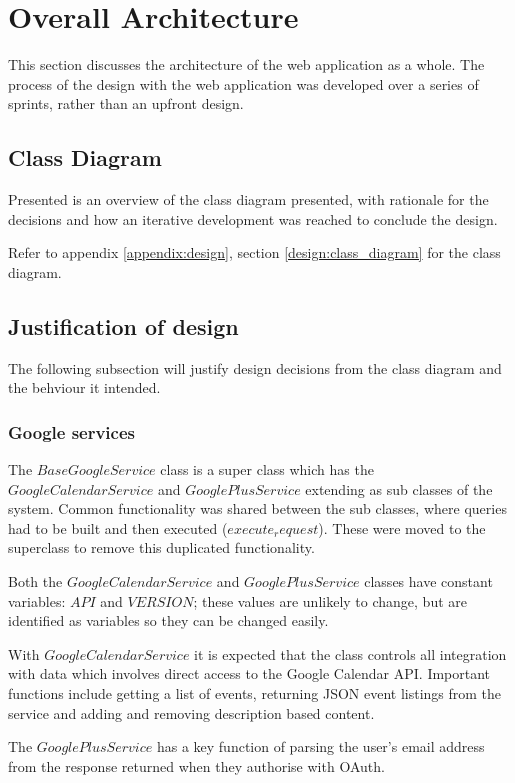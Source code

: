 \section{Overall Architecture}
This section discusses the architecture of the web application as a whole. The process of the design with the web application was developed over a series of sprints, rather than an upfront design.

\subsection{Class Diagram}
Presented is an overview of the class diagram presented, with rationale for the decisions and how an iterative development was reached to conclude the design.

Refer to appendix \ref{appendix:design}, section \ref{design:class_diagram} for the class diagram.

\subsection{Justification of design}
The following subsection will justify design decisions from the class diagram and the behviour it intended.
\subsubsection{Google services}
The $BaseGoogleService$ class is a super class which has the $GoogleCalendarService$ and $GooglePlusService$ extending as sub classes of the system. Common functionality was shared between the sub classes, where queries had to be built and then executed ($execute_request$). These were moved to the superclass to remove this duplicated functionality.

Both the $GoogleCalendarService$ and $GooglePlusService$ classes have constant variables: $API$ and $VERSION$; these values are unlikely to change, but are identified as variables so they can be changed easily.

With $GoogleCalendarService$ it is expected that the class controls all integration with data which involves direct access to the Google Calendar API. Important functions include getting a list of events, returning JSON event listings from the service and adding and removing description based content.

The $GooglePlusService$ has a key function of parsing the user's email address from the response returned when they authorise with OAuth.

